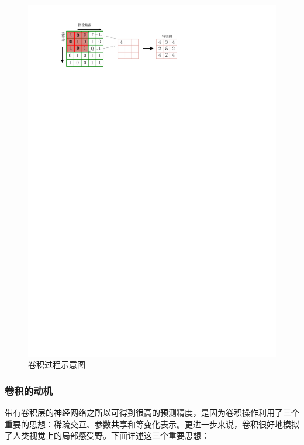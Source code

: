 \begin{figure}[htbp]
    \begin{center}
    \includegraphics{figures/conv_process.pdf}
    \caption{卷积过程示意图}\label{figure:figure3}
    \end{center}
\end{figure}

\subsubsection{卷积的动机}
带有卷积层的神经网络之所以可得到很高的预测精度，是因为卷积操作利用了三个重要的思想：稀疏交互、参数共享和等变化表示。更进一步来说，卷积很好地模拟了人类视觉上的局部感受野。下面详述这三个重要思想：

